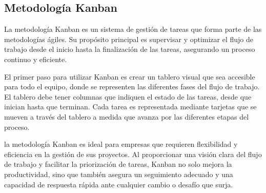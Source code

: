 \subsection{Metodología Kanban}
La metodología Kanban es un sistema de gestión de tareas que forma parte de las metodologías ágiles. Su propósito principal es supervisar y optimizar el flujo de trabajo desde el inicio hasta la finalización de las tareas, asegurando un proceso continuo y eficiente.

El primer paso para utilizar Kanban es crear un tablero visual que sea accesible para todo el equipo, donde se representen las diferentes fases del flujo de trabajo. El tablero debe tener columnas que indiquen el estado de las tareas, desde que inician hasta que terminan. Cada tarea es representada mediante tarjetas que se mueven a través del tablero a medida que avanza por las diferentes etapas del proceso.

la metodología Kanban es ideal para empresas que requieren flexibilidad y eficiencia en la gestión de sus proyectos. Al proporcionar una visión clara del flujo de trabajo y facilitar la priorización de tareas, Kanban no solo mejora la productividad, sino que también asegura un seguimiento adecuado y una capacidad de respuesta rápida ante cualquier cambio o desafío que surja.
